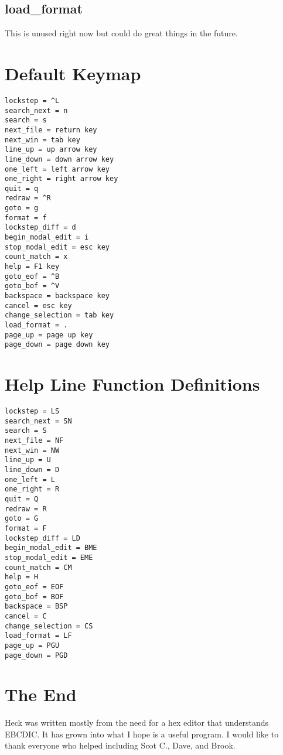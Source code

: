 \documentclass[12pt]{article}
\begin{document}
\subsection{load\_format}
This is unused right now but could do great things in the future.

\section{Default Keymap}
\label{Default Keymap}
\begin{verbatim}
lockstep = ^L
search_next = n
search = s
next_file = return key
next_win = tab key
line_up = up arrow key
line_down = down arrow key
one_left = left arrow key
one_right = right arrow key
quit = q
redraw = ^R
goto = g
format = f
lockstep_diff = d
begin_modal_edit = i
stop_modal_edit = esc key
count_match = x
help = F1 key
goto_eof = ^B
goto_bof = ^V
backspace = backspace key
cancel = esc key
change_selection = tab key
load_format = .
page_up = page up key
page_down = page down key
\end{verbatim}

\section{Help Line Function Definitions}
\label{Help Line Function Definitions}
\begin{verbatim}
lockstep = LS
search_next = SN
search = S
next_file = NF
next_win = NW
line_up = U
line_down = D
one_left = L
one_right = R
quit = Q
redraw = R
goto = G
format = F
lockstep_diff = LD
begin_modal_edit = BME
stop_modal_edit = EME
count_match = CM
help = H
goto_eof = EOF
goto_bof = BOF
backspace = BSP
cancel = C
change_selection = CS
load_format = LF
page_up = PGU
page_down = PGD
\end{verbatim}

\section{The End}
Heck was written mostly from the need for a hex editor that understands EBCDIC.
It has grown into what I hope is a useful program.
I would like to thank everyone who helped including Scot C., Dave, and Brook.
\end{document}
